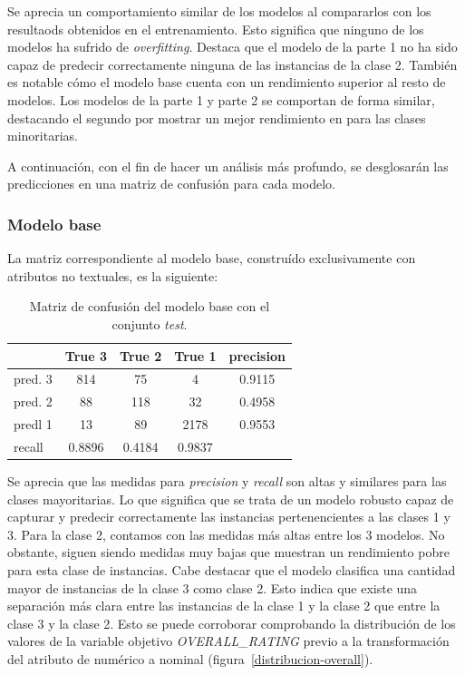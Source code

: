 \documentclass[es]{uc3mreport}
\begin{document}
\begin{report}
Se aprecia un comportamiento similar de los modelos al compararlos con los
resultaods obtenidos en el entrenamiento. Esto significa que ninguno de los
modelos ha sufrido de \textit{overfitting}. Destaca que el modelo de la parte 1
no ha sido capaz de predecir correctamente ninguna de las instancias de la clase
2. También es notable cómo el modelo base cuenta con un rendimiento superior al
resto de modelos. Los modelos de la parte 1 y parte 2 se comportan de forma
similar, destacando el segundo por mostrar un mejor rendimiento en para las
clases minoritarias.

A continuación, con el fin de hacer un análisis más profundo, se desglosarán las
predicciones en una matriz de confusión para cada modelo.

\subsubsection{Modelo base}
\label{eva-modelobase}
La matriz correspondiente al modelo base, construído exclusivamente con
atributos no textuales, es la siguiente:

\begin{table}[H]
\center
\begin{tabular}{@{}lccc|c@{}}
    \toprule
             & True 3 & True 2 & True 1 & precision\\
    \hline
    pred. 3  & 814   & 75      & 4      & 0.9115   \\
    pred. 2  & 88    & 118     & 32     & 0.4958   \\
    predl 1  & 13    & 89      & 2178   & 0.9553   \\
    \hline
    recall   & 0.8896 & 0.4184 & 0.9837 &          \\
    \bottomrule
\end{tabular}
\caption{Matriz de confusión del modelo base con el conjunto \textit{test}.}
\end{table}

Se aprecia que las medidas para \textit{precision} y \textit{recall} son altas y
similares para las clases mayoritarias. Lo que significa que se trata de un modelo robusto capaz de capturar
y predecir correctamente las instancias pertenencientes a las clases 1 y 3. Para
la clase 2, contamos con las medidas más altas entre los 3 modelos. No obstante,
siguen siendo medidas muy bajas que muestran un rendimiento pobre para esta
clase de instancias. Cabe destacar que el modelo clasifica una cantidad mayor de
instancias de la clase 3 como clase 2. Esto indica que existe una separación más
clara entre las instancias de la clase 1 y la clase 2 que entre la clase 3 y la
clase 2. Esto se puede corroborar comprobando la distribución de los valores de la variable
objetivo \textit{OVERALL\_RATING} previo a la transformación del atributo de
numérico a nominal (figura~\ref{distribucion-overall}).


\end{report}
\end{document}
